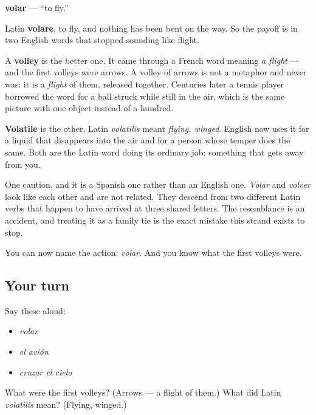 \begin{cousinweb}
\textbf{volar} — \textquotedblleft{}to fly.\textquotedblright{}

Latin \textbf{volare}, to fly, and nothing has been bent on the way. So the payoff is in two English words that stopped sounding like flight.

A \textbf{volley} is the better one. It came through a French word meaning \emph{a flight} — and the first volleys were arrows. A volley of arrows is not a metaphor and never was: it is a \emph{flight} of them, released together. Centuries later a tennis player borrowed the word for a ball struck while still in the air, which is the same picture with one object instead of a hundred.

\textbf{Volatile} is the other. Latin \emph{volatilis} meant \emph{flying, winged}. English now uses it for a liquid that disappears into the air and for a person whose temper does the same. Both are the Latin word doing its ordinary job: something that gets away from you.

One caution, and it is a Spanish one rather than an English one. \emph{Volar} and \emph{volver} look like each other and are not related. They descend from two different Latin verbs that happen to have arrived at three shared letters. The resemblance is an accident, and treating it as a family tie is the exact mistake this strand exists to stop.
\end{cousinweb}

\begin{grammarlens}[title={What you've built}]
You can now name the action: \emph{volar}. And you know what the first volleys were.
\end{grammarlens}

\subsection*{Your turn}
Say these aloud:

\begin{itemize}
\raggedright
  \item \emph{volar}
  \item \emph{el avión}
  \item \emph{cruzar el cielo}
\end{itemize}

\begin{tcolorbox}[breakable,colback=teal!4,colframe=teal!35!black,title={Before you move on}]
What were the first volleys? (Arrows — a flight of them.) What did Latin \emph{volatilis} mean? (Flying, winged.)
\end{tcolorbox}
